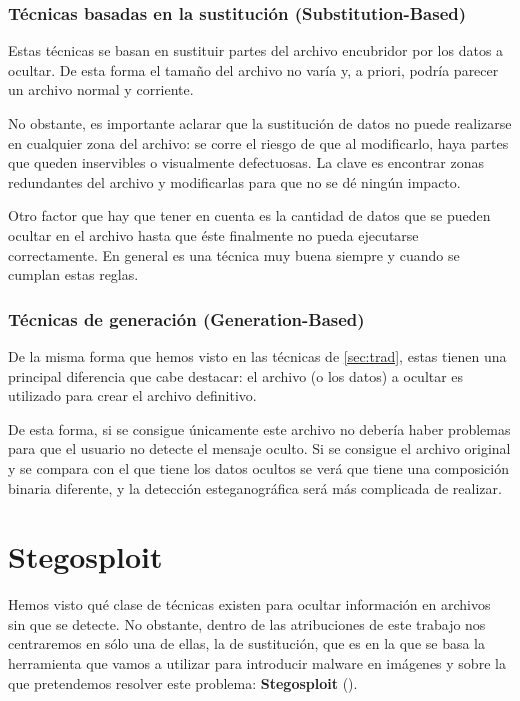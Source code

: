 \subsubsection{Técnicas basadas en la sustitución (Substitution-Based)}

Estas técnicas se basan en sustituir partes del archivo encubridor por los datos a ocultar. De esta forma el tamaño del archivo no varía y, a priori, podría parecer un archivo normal y corriente.

No obstante, es importante aclarar que la sustitución de datos no puede realizarse en cualquier zona del archivo: se corre el riesgo de que al modificarlo, haya partes que queden inservibles o visualmente defectuosas. La clave es encontrar zonas redundantes del archivo y modificarlas para que no se dé ningún impacto.

Otro factor que hay que tener en cuenta es la cantidad de datos que se pueden ocultar en el archivo hasta que éste finalmente no pueda ejecutarse correctamente. En general es una técnica muy buena siempre y cuando se cumplan estas reglas.

\subsubsection{Técnicas de generación (Generation-Based)}

De la misma forma que hemos visto en las técnicas de \ref{sec:trad}, estas tienen una principal diferencia que cabe destacar: el archivo (o los datos) a ocultar es utilizado para crear el archivo definitivo.

De esta forma, si se consigue únicamente este archivo no debería haber problemas para que el usuario no detecte el mensaje oculto. Si se consigue el archivo original y se compara con el que tiene los datos ocultos se verá que tiene una composición binaria diferente, y la detección esteganográfica será más complicada de realizar.

\section{Stegosploit}

Hemos visto qué clase de técnicas existen para ocultar información en archivos sin que se detecte. No obstante, dentro de las atribuciones de este trabajo nos centraremos en sólo una de ellas, la de sustitución, que es en la que se basa la herramienta que vamos a utilizar para introducir malware en imágenes y sobre la que pretendemos resolver este problema: \textbf{Stegosploit} (\cite{stegosploit}). %

